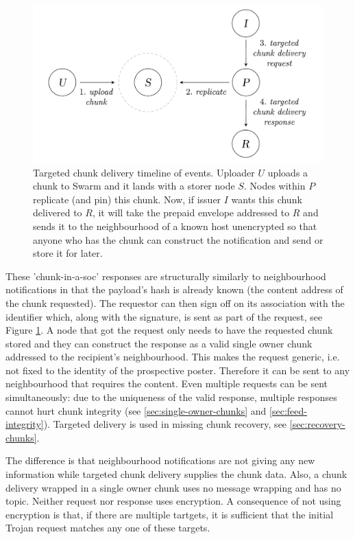 \begin{figure}[htbp]
\centering
\includegraphics[width=.8\textwidth]{fig/targeted-chunk-delivery-events.pdf}
\caption[Targeted chunk delivery timeline of events\statusgreen]{Targeted chunk delivery timeline of events. Uploader $U$ uploads a chunk to Swarm and it lands with a storer node $S$. Nodes within $P$ replicate (and pin) this chunk. Now, if issuer $I$ wants this chunk delivered to $R$, it will take the prepaid envelope addressed to $R$ and sends it to the neighbourhood of a known host unencrypted so that anyone who has the chunk can construct the notification and send or store it for later.}
\label{fig:targeted-chunk-delivery-events}
\end{figure}



These 'chunk-in-a-soc' responses are structurally similarly to neighbourhood notifications in that the payload's hash is already known (the content address of the chunk requested). The requestor can then sign off on its association with the identifier which, along with the signature, is sent as part of the request, see Figure \ref{fig:targeted-chunk-delivery-events}. A node that got the request only needs to have the requested chunk stored and they can construct the response as a valid single owner chunk addressed to the recipient's neighbourhood.
This makes the request generic, i.e. not fixed to the identity of the prospective poster. Therefore it can be sent to any neighbourhood that requires the content. Even multiple requests can be sent simultaneously: due to the uniqueness of the valid response, multiple responses cannot hurt chunk integrity (see \ref{sec:single-owner-chunks} and \ref{sec:feed-integrity}). Targeted delivery is used in missing chunk recovery, see \ref{sec:recovery-chunks}.

The difference is that neighbourhood notifications are not giving any new information while targeted chunk delivery supplies the chunk data. Also, a chunk delivery wrapped in a single owner chunk uses no message wrapping and has no topic. Neither request nor response uses encryption.
A consequence of not using encryption is that, if there are multiple tartgets, it is sufficient that the initial Trojan request matches any one of these targets. 

